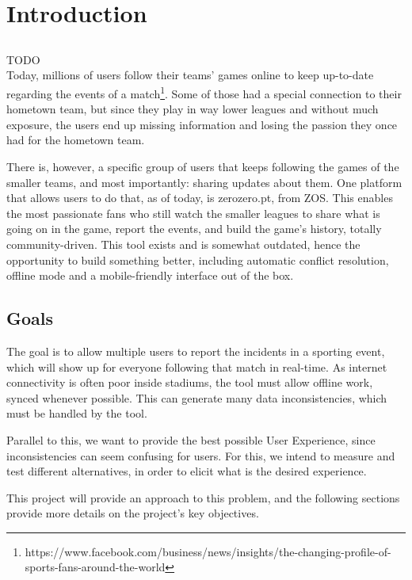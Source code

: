 \chapter{Introduction} \label{chap:intro}

\section*{}

{\Huge TODO} \\


Today, millions of users follow their teams' games online to keep up-to-date regarding the events of a match\footnote{https://www.facebook.com/business/news/insights/the-changing-profile-of-sports-fans-around-the-world}. Some of those had a special connection to their hometown team, but since they play in way lower leagues and without much exposure, the users end up missing information and losing the passion they once had for the hometown team.

There is, however,  a specific group of users that keeps following the games of the smaller teams, and most importantly: sharing updates about them. One platform that allows users to do that, as of today, is zerozero.pt, from ZOS. This enables the most passionate fans who still watch the smaller leagues to share what is going on in the game, report the events, and build the game's history, totally community-driven. This tool exists and is somewhat outdated, hence the opportunity to build something better, including automatic conflict resolution, offline mode and a mobile-friendly interface out of the box.

\section{Goals}
The goal is to allow multiple users to report the incidents in a sporting event, which will show up for everyone following that match in real-time. As internet connectivity is often poor inside stadiums, the tool must allow offline work, synced whenever possible. This can generate many data inconsistencies, which must be handled by the tool.

Parallel to this, we want to provide the best possible User Experience, since inconsistencies can seem confusing for users. For this, we intend to measure and test different alternatives, in order to elicit what is the desired experience. 

This project will provide an approach to this problem, and the following sections provide more details on the project's key objectives.

